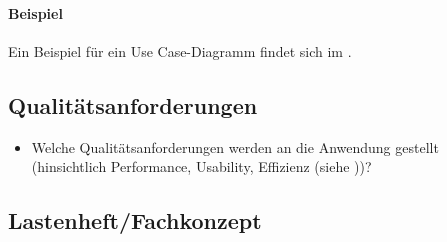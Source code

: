 \paragraph{Beispiel}
Ein Beispiel für ein Use Case-Diagramm findet sich im .


\subsection{Qualitätsanforderungen}
\label{sec:Qualitaetsanforderungen}
\begin{itemize}
	\item Welche Qualitätsanforderungen werden an die Anwendung gestellt (\zB hinsichtlich Performance, Usability, Effizienz \etc (siehe \citet{ISO9126}))?
\end{itemize}


\subsection{Lastenheft/Fachkonzept}
\label{sec:Lastenheft}

